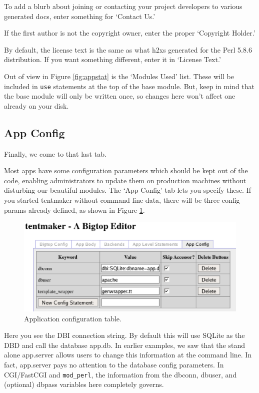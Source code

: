 To add a blurb about joining or contacting your project developers to
various generated docs, enter something for `Contact Us.'

If the first author is not the copyright owner, enter the proper
`Copyright Holder.'

By default, the license text is the same as what h2xs generated for
the Perl 5.8.6 distribution.  If you want something different, enter it
in `License Text.'

Out of view in Figure \ref{fig:appstat} is the `Modules Used' list.  These
will be included in \verb+use+ statements at the top of the base module.
But, keep in mind that the base module will only be written once, so
changes here won't affect one already on your disk.

\subsection*{App Config}

Finally, we come to that last tab.

Most apps have some configuration parameters which should be kept out of
the code, enabling administrators to update them on production machines without
disturbing our beautiful modules.  The `App Config' tab lets you
specify these.  If you started tentmaker without command line data,
there will be three config params already defined, as shown in Figure
\ref{fig:appconfig}.

\begin{figure}
\includegraphics[width=6in]{appconfig}
\caption{Application configuration table.}
\label{fig:appconfig}
\end{figure}

Here you see the DBI connection string.  By default this will use SQLite
as the DBD and call the database app.db.  In earlier examples, we saw
that the stand alone app.server allows users to change this information
at the command line.  In fact, app.server pays no attention to the database
config parameters.  In CGI/FastCGI and \verb+mod_perl+, the information
from the dbconn, dbuser, and (optional) dbpass variables here completely
governs.

